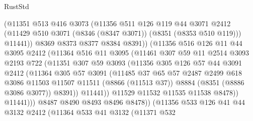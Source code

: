 \begin{lexlean}{RustStd}
\begin{coremodule}
{\begin{coremodule}
{{{{{{{{{{{{{{{{{{{{{{{{{{{{{{{{{{{{{{{{{{{{{{{{{{                    (@11351
                      @513
                      @416
                      @3073
                      (@11356
                        @511
                        @126
                        @119
                        @44
                        @3071
                        @2412
                        (@11429 @510 @3071 (@8346 (@8347 @3071)) (@8351 (@8353 @510 @119)))
                        @11441))
                    @8369
                    @8373
                    @8377
                    @8384
                    @8391))
                (@11356
                  @516
                  @126
                  @11
                  @44
                  @3095
                  @2412
                  (@11364
                    @516
                    @11
                    @3095
                    (@11461
                      @307
                      @59
                      @11
                      @2514
                      @3093
                      @2193
                      @722
                      (@11351
                        @307
                        @59
                        @3093
                        (@11356
                          @305
                          @126
                          @57
                          @44
                          @3091
                          @2412
                          (@11364
                            @305
                            @57
                            @3091
                            (@11485
                              @37
                              @65
                              @57
                              @2487
                              @2499
                              @618
                              @3086
                              @11503
                              @11507
                              @11511
                              (@8866 (@11513 @37))
                              @8884
                              (@8351 (@8886 @3086 @3077))
                              @8391))
                          @11441))
                      @11529
                      @11532
                      @11535
                      @11538
                      @8478))
                  @11441)))
            @8487
            @8490
            @8493
            @8496
            @8478))
        (@11356
          @533
          @126
          @41
          @44
          @3132
          @2412
          (@11364
            @533
            @41
            @3132
            (@11371
              @532
}}}}}}}}}}}}}}}}}}}}}}}}}}}}}}}}}}}}}}}}}}}}}}}}}}
\end{coremodule}}
\end{coremodule}
\end{lexlean}
